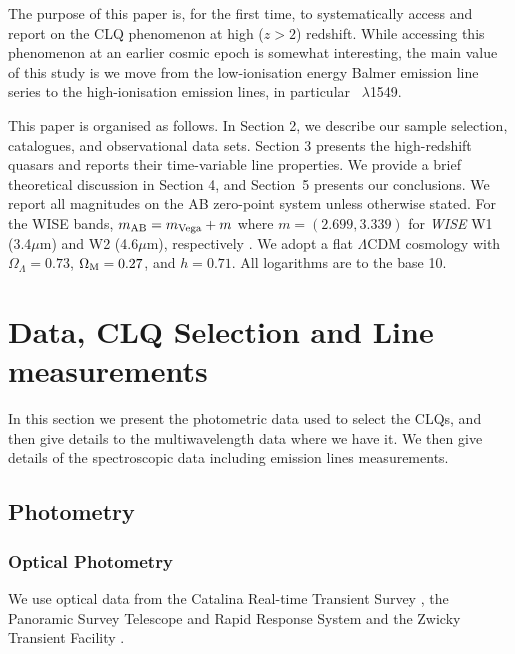 \documentclass[fleqn,usenatbib]{mnras}
\begin{document}
The purpose of this paper is, for the first time, to systematically
access and report on the CLQ phenomenon at high ($z>2$)
redshift. While accessing this phenomenon at an earlier cosmic epoch
is somewhat interesting, the main value of this study is we move from
the low-ionisation energy Balmer emission line series to the
high-ionisation emission lines, in particular \civ\ $\lambda$1549.

This paper is organised as follows. In Section 2, we describe our
sample selection, catalogues, and observational data sets.  Section
3 presents the high-redshift quasars and reports their time-variable line properties.  We provide a brief theoretical
discussion in Section 4, and Section~5 presents our conclusions.  We
report all magnitudes on the AB zero-point system \citep{Oke_Gunn1983,
Fukugita1996} unless otherwise stated. For the WISE bands, $m_{\rm AB}
= m_{\rm Vega} + m$ where $m = (2.699, 3.339)$ for {\it WISE} W1 
(3.4$\mu$m) and W2 (4.6$\mu$m), respectively \citep{Cutri2011,
Cutri2013}. We adopt a flat $\Lambda$CDM cosmology with
$\Omega_{\Lambda} = 0.73 $, $\Omega_{\rm M} = 0.27$, and $h =
0.71$. All logarithms are to the base 10.


\section{Data, CLQ Selection and Line measurements}
In this section we present the photometric data used to select the
CLQs, and then give details to the multiwavelength data where we have
it. We then give details of the spectroscopic data including emission
lines measurements.

\subsection{Photometry}
\subsubsection{Optical Photometry}
We use optical data from the Catalina Real-time Transient Survey
\citep[CRTS;][]{Drake2009, Mahabal2011}, the Panoramic Survey
Telescope and Rapid Response System \citep[PanSTARRS;][]{Kaiser2010,
Stubbs2010, Tonry2012, Magnier2013} and the Zwicky Transient Facility
\citep[ZTF;][]{Bellm2019_ZTFOverview}. 
\end{document}
